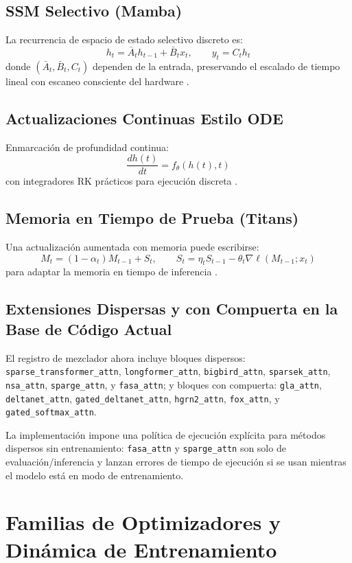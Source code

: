 \documentclass[11pt,a4paper]{article}
\begin{document}
\subsection{SSM Selectivo (Mamba)}
La recurrencia de espacio de estado selectivo discreto es:
\[
h_t=\bar{A}_t h_{t-1}+\bar{B}_t x_t,\qquad y_t=C_t h_t
\]
donde $(\bar{A}_t,\bar{B}_t,C_t)$ dependen de la entrada, preservando el escalado de tiempo lineal con escaneo consciente del hardware \citep{gu_mamba_2023,hwang_hydra_2024}.

\subsection{Actualizaciones Continuas Estilo ODE}
Enmarcación de profundidad continua:
\[
\frac{dh(t)}{dt}=f_\theta(h(t),t)
\]
con integradores RK prácticos para ejecución discreta \citep{zhang_continuous_2021}.

\subsection{Memoria en Tiempo de Prueba (Titans)}
Una actualización aumentada con memoria puede escribirse:
\[
M_t=(1-\alpha_t)M_{t-1}+S_t,\qquad
S_t=\eta_t S_{t-1}-\theta_t\nabla \ell(M_{t-1};x_t)
\]
para adaptar la memoria en tiempo de inferencia \citep{behrouz_titans_2025,behrouz_titans_2024}.

\subsection{Extensiones Dispersas y con Compuerta en la Base de Código Actual}
El registro de mezclador ahora incluye bloques dispersos:
\texttt{sparse\_transformer\_attn}, \texttt{longformer\_attn}, \texttt{bigbird\_attn},
\texttt{sparsek\_attn}, \texttt{nsa\_attn}, \texttt{sparge\_attn}, y \texttt{fasa\_attn};
y bloques con compuerta:
\texttt{gla\_attn}, \texttt{deltanet\_attn}, \texttt{gated\_deltanet\_attn},
\texttt{hgrn2\_attn}, \texttt{fox\_attn}, y \texttt{gated\_softmax\_attn}.

La implementación impone una política de ejecución explícita para métodos dispersos sin entrenamiento:
\texttt{fasa\_attn} y \texttt{sparge\_attn} son solo de evaluación/inferencia y lanzan errores de tiempo de ejecución si se usan mientras el modelo está en modo de entrenamiento.

\section{Familias de Optimizadores y Dinámica de Entrenamiento}
\label{sec:optimizer-families}
\end{document}
